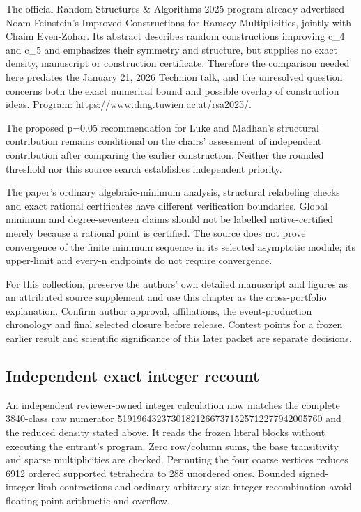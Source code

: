 \documentclass[11pt,a4paper]{article}
\begin{document}
The official Random Structures \& Algorithms 2025 program already advertised Noam Feinstein's Improved Constructions for Ramsey Multiplicities, jointly with Chaim Even-Zohar. Its abstract describes random constructions improving c\_4 and c\_5 and emphasizes their symmetry and structure, but supplies no exact density, manuscript or construction certificate. Therefore the comparison needed here predates the January 21, 2026 Technion talk, and the unresolved question concerns both the exact numerical bound and possible overlap of construction ideas. Program: \url{https://www.dmg.tuwien.ac.at/rsa2025/}.

The proposed p=0.05 recommendation for Luke and Madhan's structural contribution remains conditional on the chairs' assessment of independent contribution after comparing the earlier construction. Neither the rounded threshold nor this source search establishes independent priority.

The paper's ordinary algebraic-minimum analysis, structural relabeling checks and exact rational certificates have different verification boundaries. Global minimum and degree-seventeen claims should not be labelled native-certified merely because a rational point is certified. The source does not prove convergence of the finite minimum sequence in its selected asymptotic module; its upper-limit and every-n endpoints do not require convergence.

For this collection, preserve the authors' own detailed manuscript and figures as an attributed source supplement and use this chapter as the cross-portfolio explanation. Confirm author approval, affiliations, the event-production chronology and final selected closure before release. Contest points for a frozen earlier result and scientific significance of this later packet are separate decisions.

\subsection{Independent exact integer recount}
An independent reviewer-owned integer calculation now matches the complete 3840-class raw numerator 519196432373018212667371525712277942005760 and the reduced density stated above. It reads the frozen literal blocks without executing the entrant's program. Zero row/column sums, the base transitivity and sparse multiplicities are checked. Permuting the four coarse vertices reduces 6912 ordered supported tetrahedra to 288 unordered ones. Bounded signed-integer limb contractions and ordinary arbitrary-size integer recombination avoid floating-point arithmetic and overflow.
\end{document}
